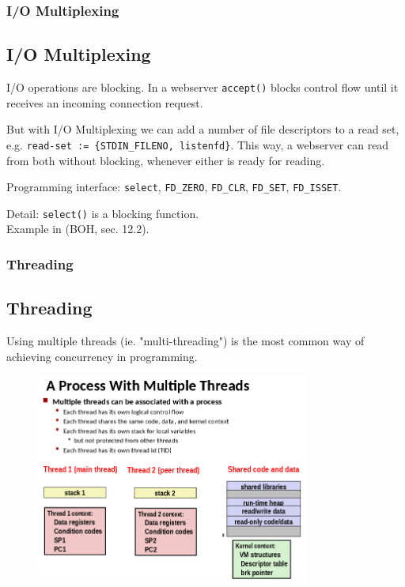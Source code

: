 \documentclass{beamer}
\begin{document}
%
%
%
\begin{frame}
\frametitle{I/O Multiplexing}
\subsection{I/O Multiplexing}
I/O operations are blocking. In a webserver \texttt{accept()} blocks control flow
until it receives an incoming connection request.\\\vspace{3mm}

But with I/O Multiplexing we can add a number of file descriptors to a read set,
e.g. \texttt{read-set := \{STDIN\_FILENO, listenfd\}}. This way, a webserver can
read from both without blocking, whenever either is ready for reading.\\\vspace{3mm}

Programming interface: \texttt{select}, \texttt{FD\_ZERO}, \texttt{FD\_CLR},
\texttt{FD\_SET}, \texttt{FD\_ISSET}.\\\vspace{3mm}

Detail: \texttt{select()} is a blocking function.\\
Example in (BOH, sec. 12.2).

\end{frame}



%
%
%
\begin{frame}
\frametitle{Threading}
\subsection{Threading}
Using multiple threads (ie. "multi-threading") is the most common way of achieving
concurrency in programming.\\

\begin{figure}
\includegraphics[width=0.8\textwidth]{images/process-with-multiple-threads.png}
\end{figure}

\end{frame}
\end{document}
